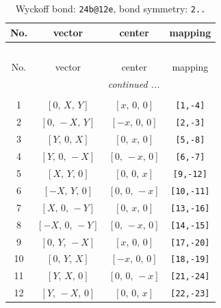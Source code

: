 \documentclass[fleqn,8pt]{jsarticle}
\begin{document}
\renewcommand{\arraystretch}{1.2}
\begin{longtable}{cccc}
\caption{Wyckoff bond: {\tt 24b@12e}, bond symmetry: {\tt 2..}}
 \\
 \hline \hline
No. & vector & center & mapping \\ \hline \endfirsthead

\multicolumn{3}{l}{\tablename\ \thetable{}} \\
 \hline \hline
No. & vector & center & mapping \\ \hline \endhead

 \hline \hline
\multicolumn{3}{r}{\footnotesize\it continued ...} \\ \endfoot

 \hline \hline
\multicolumn{3}{r}{} \\ \endlastfoot

1 & $\left[ 0,\, X,\, Y \right]$ & $\left[ x,\, 0,\, 0 \right]$ & {\tt [1,-4]} \\ \hline
2 & $\left[ 0,\, - X,\, Y \right]$ & $\left[ - x,\, 0,\, 0 \right]$ & {\tt [2,-3]} \\ \hline
3 & $\left[ Y,\, 0,\, X \right]$ & $\left[ 0,\, x,\, 0 \right]$ & {\tt [5,-8]} \\ \hline
4 & $\left[ Y,\, 0,\, - X \right]$ & $\left[ 0,\, - x,\, 0 \right]$ & {\tt [6,-7]} \\ \hline
5 & $\left[ X,\, Y,\, 0 \right]$ & $\left[ 0,\, 0,\, x \right]$ & {\tt [9,-12]} \\ \hline
6 & $\left[ - X,\, Y,\, 0 \right]$ & $\left[ 0,\, 0,\, - x \right]$ & {\tt [10,-11]} \\ \hline
7 & $\left[ X,\, 0,\, - Y \right]$ & $\left[ 0,\, x,\, 0 \right]$ & {\tt [13,-16]} \\ \hline
8 & $\left[ - X,\, 0,\, - Y \right]$ & $\left[ 0,\, - x,\, 0 \right]$ & {\tt [14,-15]} \\ \hline
9 & $\left[ 0,\, Y,\, - X \right]$ & $\left[ x,\, 0,\, 0 \right]$ & {\tt [17,-20]} \\ \hline
10 & $\left[ 0,\, Y,\, X \right]$ & $\left[ - x,\, 0,\, 0 \right]$ & {\tt [18,-19]} \\ \hline
11 & $\left[ Y,\, X,\, 0 \right]$ & $\left[ 0,\, 0,\, - x \right]$ & {\tt [21,-24]} \\ \hline
12 & $\left[ Y,\, - X,\, 0 \right]$ & $\left[ 0,\, 0,\, x \right]$ & {\tt [22,-23]} \\
\end{longtable}
\renewcommand{\arraystretch}{1.2}
\end{document}
